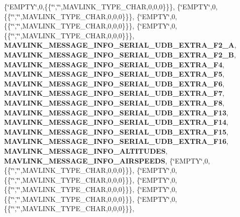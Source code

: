 \begin{DoxyCompactItemize}
\{\char`\"{}E\+M\+P\+TY\char`\"{},0,\{\{\char`\"{}\char`\"{},\char`\"{}\char`\"{},M\+A\+V\+L\+I\+N\+K\+\_\+\+T\+Y\+P\+E\+\_\+\+C\+H\+AR,0,0,0\}\}\}, \{\char`\"{}E\+M\+P\+TY\char`\"{},0,\{\{\char`\"{}\char`\"{},\char`\"{}\char`\"{},M\+A\+V\+L\+I\+N\+K\+\_\+\+T\+Y\+P\+E\+\_\+\+C\+H\+AR,0,0,0\}\}\}, \{\char`\"{}E\+M\+P\+TY\char`\"{},0,\{\{\char`\"{}\char`\"{},\char`\"{}\char`\"{},M\+A\+V\+L\+I\+N\+K\+\_\+\+T\+Y\+P\+E\+\_\+\+C\+H\+AR,0,0,0\}\}\}, \{\char`\"{}E\+M\+P\+TY\char`\"{},0,\{\{\char`\"{}\char`\"{},\char`\"{}\char`\"{},M\+A\+V\+L\+I\+N\+K\+\_\+\+T\+Y\+P\+E\+\_\+\+C\+H\+AR,0,0,0\}\}\}, \textbf{ M\+A\+V\+L\+I\+N\+K\+\_\+\+M\+E\+S\+S\+A\+G\+E\+\_\+\+I\+N\+F\+O\+\_\+\+S\+E\+R\+I\+A\+L\+\_\+\+U\+D\+B\+\_\+\+E\+X\+T\+R\+A\+\_\+\+F2\+\_\+A}, \textbf{ M\+A\+V\+L\+I\+N\+K\+\_\+\+M\+E\+S\+S\+A\+G\+E\+\_\+\+I\+N\+F\+O\+\_\+\+S\+E\+R\+I\+A\+L\+\_\+\+U\+D\+B\+\_\+\+E\+X\+T\+R\+A\+\_\+\+F2\+\_\+B}, \textbf{ M\+A\+V\+L\+I\+N\+K\+\_\+\+M\+E\+S\+S\+A\+G\+E\+\_\+\+I\+N\+F\+O\+\_\+\+S\+E\+R\+I\+A\+L\+\_\+\+U\+D\+B\+\_\+\+E\+X\+T\+R\+A\+\_\+\+F4}, \textbf{ M\+A\+V\+L\+I\+N\+K\+\_\+\+M\+E\+S\+S\+A\+G\+E\+\_\+\+I\+N\+F\+O\+\_\+\+S\+E\+R\+I\+A\+L\+\_\+\+U\+D\+B\+\_\+\+E\+X\+T\+R\+A\+\_\+\+F5}, \textbf{ M\+A\+V\+L\+I\+N\+K\+\_\+\+M\+E\+S\+S\+A\+G\+E\+\_\+\+I\+N\+F\+O\+\_\+\+S\+E\+R\+I\+A\+L\+\_\+\+U\+D\+B\+\_\+\+E\+X\+T\+R\+A\+\_\+\+F6}, \textbf{ M\+A\+V\+L\+I\+N\+K\+\_\+\+M\+E\+S\+S\+A\+G\+E\+\_\+\+I\+N\+F\+O\+\_\+\+S\+E\+R\+I\+A\+L\+\_\+\+U\+D\+B\+\_\+\+E\+X\+T\+R\+A\+\_\+\+F7}, \textbf{ M\+A\+V\+L\+I\+N\+K\+\_\+\+M\+E\+S\+S\+A\+G\+E\+\_\+\+I\+N\+F\+O\+\_\+\+S\+E\+R\+I\+A\+L\+\_\+\+U\+D\+B\+\_\+\+E\+X\+T\+R\+A\+\_\+\+F8}, \textbf{ M\+A\+V\+L\+I\+N\+K\+\_\+\+M\+E\+S\+S\+A\+G\+E\+\_\+\+I\+N\+F\+O\+\_\+\+S\+E\+R\+I\+A\+L\+\_\+\+U\+D\+B\+\_\+\+E\+X\+T\+R\+A\+\_\+\+F13}, \textbf{ M\+A\+V\+L\+I\+N\+K\+\_\+\+M\+E\+S\+S\+A\+G\+E\+\_\+\+I\+N\+F\+O\+\_\+\+S\+E\+R\+I\+A\+L\+\_\+\+U\+D\+B\+\_\+\+E\+X\+T\+R\+A\+\_\+\+F14}, \textbf{ M\+A\+V\+L\+I\+N\+K\+\_\+\+M\+E\+S\+S\+A\+G\+E\+\_\+\+I\+N\+F\+O\+\_\+\+S\+E\+R\+I\+A\+L\+\_\+\+U\+D\+B\+\_\+\+E\+X\+T\+R\+A\+\_\+\+F15}, \textbf{ M\+A\+V\+L\+I\+N\+K\+\_\+\+M\+E\+S\+S\+A\+G\+E\+\_\+\+I\+N\+F\+O\+\_\+\+S\+E\+R\+I\+A\+L\+\_\+\+U\+D\+B\+\_\+\+E\+X\+T\+R\+A\+\_\+\+F16}, \textbf{ M\+A\+V\+L\+I\+N\+K\+\_\+\+M\+E\+S\+S\+A\+G\+E\+\_\+\+I\+N\+F\+O\+\_\+\+A\+L\+T\+I\+T\+U\+D\+ES}, \textbf{ M\+A\+V\+L\+I\+N\+K\+\_\+\+M\+E\+S\+S\+A\+G\+E\+\_\+\+I\+N\+F\+O\+\_\+\+A\+I\+R\+S\+P\+E\+E\+DS}, \{\char`\"{}E\+M\+P\+TY\char`\"{},0,\{\{\char`\"{}\char`\"{},\char`\"{}\char`\"{},M\+A\+V\+L\+I\+N\+K\+\_\+\+T\+Y\+P\+E\+\_\+\+C\+H\+AR,0,0,0\}\}\}, \{\char`\"{}E\+M\+P\+TY\char`\"{},0,\{\{\char`\"{}\char`\"{},\char`\"{}\char`\"{},M\+A\+V\+L\+I\+N\+K\+\_\+\+T\+Y\+P\+E\+\_\+\+C\+H\+AR,0,0,0\}\}\}, \{\char`\"{}E\+M\+P\+TY\char`\"{},0,\{\{\char`\"{}\char`\"{},\char`\"{}\char`\"{},M\+A\+V\+L\+I\+N\+K\+\_\+\+T\+Y\+P\+E\+\_\+\+C\+H\+AR,0,0,0\}\}\}, \{\char`\"{}E\+M\+P\+TY\char`\"{},0,\{\{\char`\"{}\char`\"{},\char`\"{}\char`\"{},M\+A\+V\+L\+I\+N\+K\+\_\+\+T\+Y\+P\+E\+\_\+\+C\+H\+AR,0,0,0\}\}\}, \{\char`\"{}E\+M\+P\+TY\char`\"{},0,\{\{\char`\"{}\char`\"{},\char`\"{}\char`\"{},M\+A\+V\+L\+I\+N\+K\+\_\+\+T\+Y\+P\+E\+\_\+\+C\+H\+AR,0,0,0\}\}\}, 
\end{DoxyCompactItemize}
